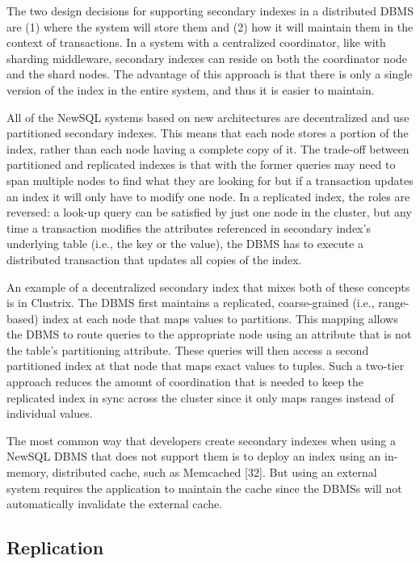 \documentclass[a4paper,11pt,twoside,openright]{article}
\begin{document}
The two design decisions for supporting secondary indexes in a
distributed DBMS are (1) where the system will store them and (2) how it
will maintain them in the context of transactions. In a system with a
centralized coordinator, like with sharding middleware, secondary
indexes can reside on both the coordinator node and the shard nodes. The
advantage of this approach is that there is only a single version of the
index in the entire system, and thus it is easier to maintain.

All of the NewSQL systems based on new architectures are decentralized
and use partitioned secondary indexes. This means that each node stores
a portion of the index, rather than each node having a complete copy of
it. The trade-off between partitioned and replicated indexes is that
with the former queries may need to span multiple nodes to find what
they are looking for but if a transaction updates an index it will only
have to modify one node. In a replicated index, the roles are reversed:
a look-up query can be satisfied by just one node in the cluster, but
any time a transaction modifies the attributes referenced in secondary
index's underlying table (i.e., the key or the value), the DBMS has to
execute a distributed transaction that updates all copies of the index.

An example of a decentralized secondary index that mixes both of these
concepts is in Clustrix. The DBMS first maintains a replicated,
coarse-grained (i.e., range-based) index at each node that maps values
to partitions. This mapping allows the DBMS to route queries to the
appropriate node using an attribute that is not the table's partitioning
attribute. These queries will then access a second partitioned index at
that node that maps exact values to tuples. Such a two-tier approach
reduces the amount of coordination that is needed to keep the replicated
index in sync across the cluster since it only maps ranges instead of
individual values.

The most common way that developers create secondary indexes when using
a NewSQL DBMS that does not support them is to deploy an index using an
in-memory, distributed cache, such as Memcached {[}32{]}. But using an
external system requires the application to maintain the cache since the
DBMSs will not automatically invalidate the external cache.

\hypertarget{replication}{%
\subsection{Replication}\label{replication}}
\end{document}
